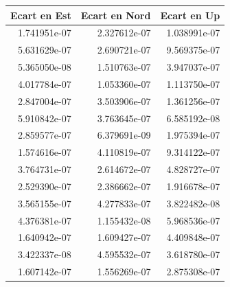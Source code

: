 \begin{tabular}{rrr}
\toprule
Ecart en Est & Ecart en Nord &  Ecart en Up \\
\midrule
1.741951e-07 &  2.327612e-07 & 1.038991e-07 \\
5.631629e-07 &  2.690721e-07 & 9.569375e-07 \\
5.365050e-08 &  1.510763e-07 & 3.947037e-07 \\
4.017784e-07 &  1.053360e-07 & 1.113750e-07 \\
2.847004e-07 &  3.503906e-07 & 1.361256e-07 \\
5.910842e-07 &  3.763645e-07 & 6.585192e-08 \\
2.859577e-07 &  6.379691e-09 & 1.975394e-07 \\
1.574616e-07 &  4.110819e-07 & 9.314122e-07 \\
3.764731e-07 &  2.614672e-07 & 4.828727e-07 \\
2.529390e-07 &  2.386662e-07 & 1.916678e-07 \\
3.565155e-07 &  4.277833e-07 & 3.822482e-08 \\
4.376381e-07 &  1.155432e-08 & 5.968536e-07 \\
1.640942e-07 &  1.609427e-07 & 4.409848e-07 \\
3.422337e-08 &  4.595532e-07 & 3.618780e-07 \\
1.607142e-07 &  1.556269e-07 & 2.875308e-07 \\
\bottomrule
\end{tabular}
